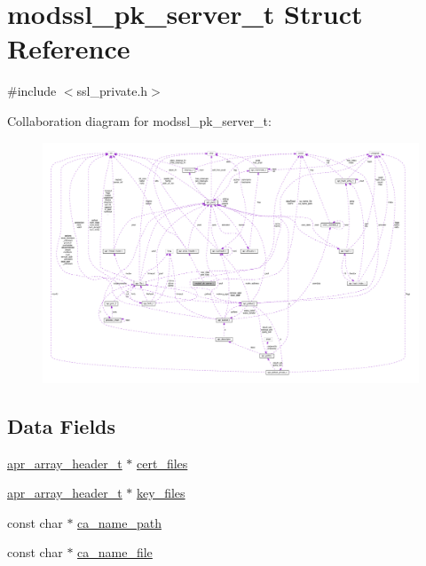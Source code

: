 \hypertarget{structmodssl__pk__server__t}{}\section{modssl\+\_\+pk\+\_\+server\+\_\+t Struct Reference}
\label{structmodssl__pk__server__t}


{\ttfamily \#include $<$ssl\+\_\+private.\+h$>$}



Collaboration diagram for modssl\+\_\+pk\+\_\+server\+\_\+t\+:
\nopagebreak
\begin{figure}[H]
\begin{center}
\leavevmode
\includegraphics[width=350pt]{structmodssl__pk__server__t__coll__graph}
\end{center}
\end{figure}
\subsection*{Data Fields}
\begin{DoxyCompactItemize}
\item 
\hyperlink{structapr__array__header__t}{apr\+\_\+array\+\_\+header\+\_\+t} $\ast$ \hyperlink{structmodssl__pk__server__t_a8dd3a812b6a91f1d95a7958a8674a72d}{cert\+\_\+files}
\item 
\hyperlink{structapr__array__header__t}{apr\+\_\+array\+\_\+header\+\_\+t} $\ast$ \hyperlink{structmodssl__pk__server__t_a268bb361b606aa0037602ee09eac319e}{key\+\_\+files}
\item 
const char $\ast$ \hyperlink{structmodssl__pk__server__t_a9c9ec7bc40789faf515444c23df3fe38}{ca\+\_\+name\+\_\+path}
\item 
const char $\ast$ \hyperlink{structmodssl__pk__server__t_ad6f1c8953aab63409070ced65e2e8f73}{ca\+\_\+name\+\_\+file}
\end{DoxyCompactItemize}


